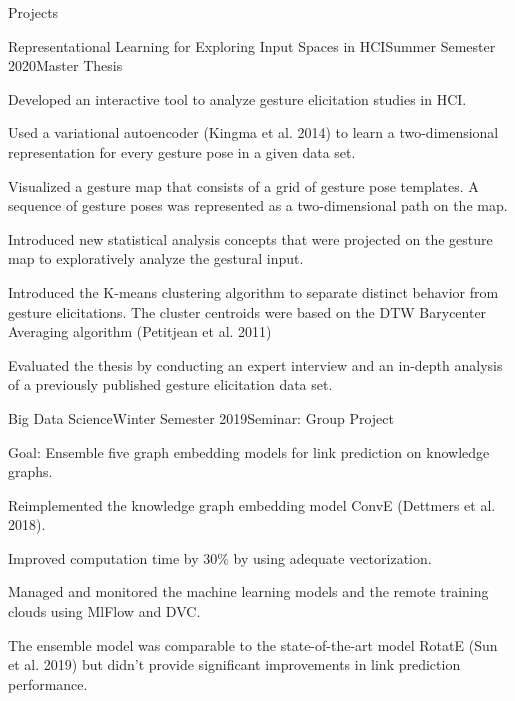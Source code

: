 \documentclass{resume} %
\begin{document}
\begin{rSection}{Projects}

\begin{rSubsection}{Representational Learning for Exploring Input Spaces in HCI}{Summer Semester 2020}{Master Thesis}{}
\item Developed an interactive tool to analyze gesture elicitation studies in HCI.
\item Used a variational autoencoder (Kingma et al. 2014) to learn a two-dimensional representation for every gesture pose in a given data set.
\item Visualized a gesture map that consists of a grid of gesture pose templates. A sequence of gesture poses was represented as a two-dimensional path on the map.
\item Introduced new statistical analysis concepts that were projected on the gesture map to exploratively analyze the gestural input.
\item Introduced the K-means clustering algorithm to separate distinct behavior from gesture elicitations. The cluster centroids were based on the DTW Barycenter Averaging algorithm (Petitjean et al. 2011)
\item Evaluated the thesis by conducting an expert interview and an in-depth analysis of a previously published gesture elicitation data set.
\end{rSubsection}

\vfill
\pagebreak

\begin{rSubsection}{Big Data Science}{Winter Semester 2019}{Seminar: Group Project}{}
\item Goal: Ensemble five graph embedding models for link prediction on knowledge graphs.
\item Reimplemented the knowledge graph embedding model ConvE (Dettmers et al. 2018).
\item Improved computation time by 30\% by using adequate vectorization.
\item Managed and monitored the machine learning models and the remote training clouds using MlFlow and DVC.
\item The ensemble model was comparable to the state-of-the-art model RotatE (Sun et al. 2019) but didn't provide significant improvements in link prediction performance.
\end{rSubsection}


\end{rSection}
\end{document}
